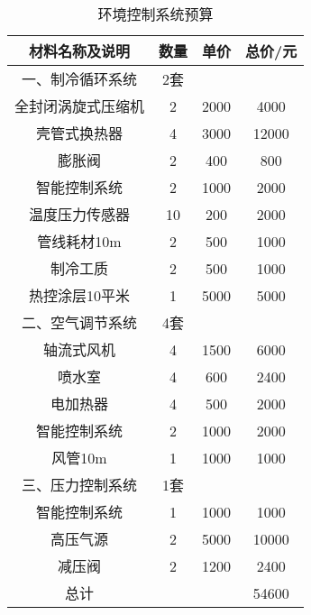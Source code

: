 \begin{table}[H]
  \centering
  \caption{环境控制系统预算}
  \label{tab:budge-envctrl}
  \begin{tabular}{|c|c|c|c|}
    \hline
    材料名称及说明 & 数量 & 单价 & 总价/元    \tabularnewline\hline
    一、制冷循环系统 & 2套 &  &     \tabularnewline\hline
    全封闭涡旋式压缩机 & 2 & 2000 & 4000    \tabularnewline\hline
    壳管式换热器 & 4 & 3000 & 12000    \tabularnewline\hline
    膨胀阀 & 2 & 400 & 800    \tabularnewline\hline
    智能控制系统 & 2 & 1000 & 2000    \tabularnewline\hline
    温度压力传感器 & 10 & 200 & 2000    \tabularnewline\hline
    管线耗材10m & 2 & 500 & 1000    \tabularnewline\hline
    制冷工质 & 2 & 500 & 1000    \tabularnewline\hline
    热控涂层10平米 & 1 & 5000 & 5000    \tabularnewline\hline
    二、空气调节系统 & 4套 &  &     \tabularnewline\hline
    轴流式风机 & 4 & 1500 & 6000    \tabularnewline\hline
    喷水室 & 4 & 600 & 2400    \tabularnewline\hline
    电加热器 & 4 & 500 & 2000    \tabularnewline\hline
    智能控制系统 & 2 & 1000 & 2000    \tabularnewline\hline
    风管10m & 1 & 1000 & 1000    \tabularnewline\hline
    三、压力控制系统 & 1套 &  &     \tabularnewline\hline
    智能控制系统 & 1 & 1000 & 1000    \tabularnewline\hline
    高压气源 & 2 & 5000 & 10000    \tabularnewline\hline
    减压阀 & 2 & 1200 & 2400    \tabularnewline\hline
    总计 &  &  & 54600    \tabularnewline\hline
  \end{tabular}
\end{table}
